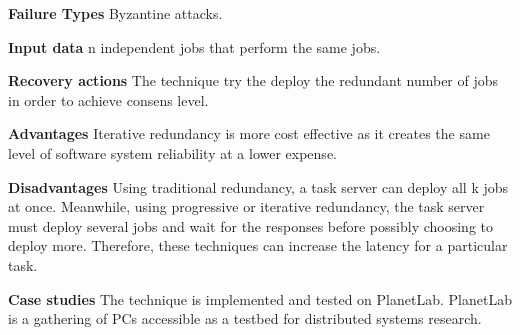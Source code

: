 \begin{compactitem}
\item[\textbf{Failure Types}]Byzantine attacks.

\item[\textbf{Input data}] n independent jobs that perform the same jobs.

\item[\textbf{Recovery actions}]The technique try the deploy the redundant number of jobs in order to achieve consens level.

\item[\textbf{Advantages}] Iterative redundancy is more cost effective as it creates the same level of software system reliability at a lower expense.

\item[\textbf{Disadvantages}] Using traditional redundancy, a task server can deploy all k jobs at once. Meanwhile, using progressive or iterative redundancy, the task server must deploy several jobs and wait for the responses before possibly choosing to deploy more. Therefore, these techniques can increase the latency for a particular task.

\item[\textbf{Case studies}]
The technique is implemented and tested on PlanetLab. PlanetLab is a gathering of PCs accessible as a testbed for distributed systems research.\\
\end{compactitem}


